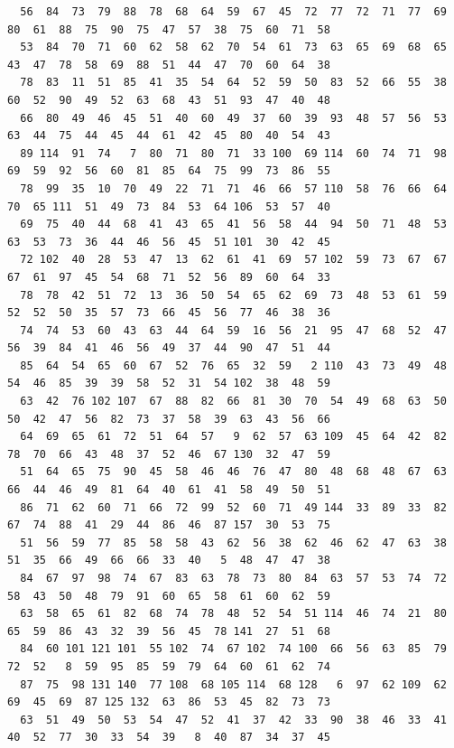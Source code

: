 \documentclass[a4j]{jarticle}
\begin{document}
{\baselineskip 2mm
  \scriptsize
\begin{verbatim}
  56  84  73  79  88  78  68  64  59  67  45  72  77  72  71  77  69  80  61  88  75  90  75  47  57  38  75  60  71  58
  53  84  70  71  60  62  58  62  70  54  61  73  63  65  69  68  65  43  47  78  58  69  88  51  44  47  70  60  64  38
  78  83  11  51  85  41  35  54  64  52  59  50  83  52  66  55  38  60  52  90  49  52  63  68  43  51  93  47  40  48
  66  80  49  46  45  51  40  60  49  37  60  39  93  48  57  56  53  63  44  75  44  45  44  61  42  45  80  40  54  43
  89 114  91  74   7  80  71  80  71  33 100  69 114  60  74  71  98  69  59  92  56  60  81  85  64  75  99  73  86  55
  78  99  35  10  70  49  22  71  71  46  66  57 110  58  76  66  64  70  65 111  51  49  73  84  53  64 106  53  57  40
  69  75  40  44  68  41  43  65  41  56  58  44  94  50  71  48  53  63  53  73  36  44  46  56  45  51 101  30  42  45
  72 102  40  28  53  47  13  62  61  41  69  57 102  59  73  67  67  67  61  97  45  54  68  71  52  56  89  60  64  33
  78  78  42  51  72  13  36  50  54  65  62  69  73  48  53  61  59  52  52  50  35  57  73  66  45  56  77  46  38  36
  74  74  53  60  43  63  44  64  59  16  56  21  95  47  68  52  47  56  39  84  41  46  56  49  37  44  90  47  51  44
  85  64  54  65  60  67  52  76  65  32  59   2 110  43  73  49  48  54  46  85  39  39  58  52  31  54 102  38  48  59
  63  42  76 102 107  67  88  82  66  81  30  70  54  49  68  63  50  50  42  47  56  82  73  37  58  39  63  43  56  66
  64  69  65  61  72  51  64  57   9  62  57  63 109  45  64  42  82  78  70  66  43  48  37  52  46  67 130  32  47  59
  51  64  65  75  90  45  58  46  46  76  47  80  48  68  48  67  63  66  44  46  49  81  64  40  61  41  58  49  50  51
  86  71  62  60  71  66  72  99  52  60  71  49 144  33  89  33  82  67  74  88  41  29  44  86  46  87 157  30  53  75
  51  56  59  77  85  58  58  43  62  56  38  62  46  62  47  63  38  51  35  66  49  66  66  33  40   5  48  47  47  38
  84  67  97  98  74  67  83  63  78  73  80  84  63  57  53  74  72  58  43  50  48  79  91  60  65  58  61  60  62  59
  63  58  65  61  82  68  74  78  48  52  54  51 114  46  74  21  80  65  59  86  43  32  39  56  45  78 141  27  51  68
  84  60 101 121 101  55 102  74  67 102  74 100  66  56  63  85  79  72  52   8  59  95  85  59  79  64  60  61  62  74
  87  75  98 131 140  77 108  68 105 114  68 128   6  97  62 109  62  69  45  69  87 125 132  63  86  53  45  82  73  73
  63  51  49  50  53  54  47  52  41  37  42  33  90  38  46  33  41  40  52  77  30  33  54  39   8  40  87  34  37  45

\end{verbatim}}
\end{document}
